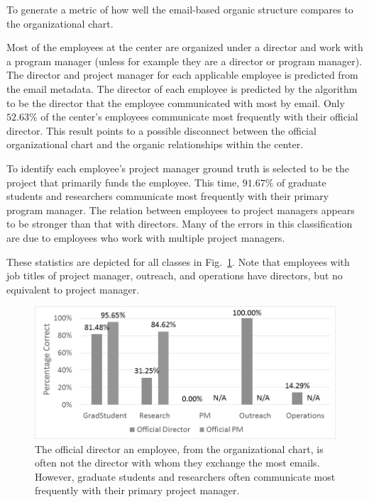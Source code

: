 \documentclass[10pt,twocolumn,conference]{IEEEtran}
\begin{document}
To generate a metric of how well the email-based organic structure compares to the organizational chart.

Most of the employees at the center are organized under a director and work with a program manager (unless for example they are a director or program manager).
The director and project manager for each applicable employee is predicted from the email metadata. 
The director of each employee is predicted by the algorithm to be the director that the employee communicated with most by email.
Only $52.63\%$ of the center's employees communicate most frequently with their official director.
This result points to a possible disconnect between the official organizational chart and the organic relationships within the center.

To identify each employee's project manager ground truth is selected to be the project that primarily funds the employee.
This time, $91.67\%$ of graduate students and researchers communicate most frequently with their primary program manager.
The relation between employees to project managers appears to be stronger than that with directors.
Many of the errors in this classification are due to employees who work with multiple project managers.

These statistics are depicted for all classes in Fig.~\ref{fig:project_analysis}.
Note that employees with job titles of project manager, outreach, and operations have directors, but no equivalent to project manager.


\begin{figure}[t]
	\centering
	\includegraphics[width=\columnwidth,trim={1mm 5mm 10mm 2mm},clip]{superior_identification_BW}
    \vspace{-18pt}
	\caption{The official director an employee, from the organizational chart, is often not the director with whom they exchange the most emails.  However, graduate students and researchers often communicate most frequently with their primary project manager.}
	\vspace{-12pt}
	\label{fig:project_analysis}
\end{figure}
\end{document}
